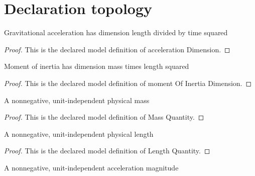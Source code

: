 \section{Declaration topology}
\begin{definition}
  \label{def:physics:phyx-mini-0782:phyxminiproblems-problemphyxmini0782-accelerationdimension}
  Gravitational acceleration has dimension length divided by time squared
\end{definition}
\begin{proof}
  This is the declared model definition of acceleration Dimension.
\end{proof}
\begin{definition}
  \label{def:physics:phyx-mini-0782:phyxminiproblems-problemphyxmini0782-momentofinertiadimension}
  Moment of inertia has dimension mass times length squared
\end{definition}
\begin{proof}
  This is the declared model definition of moment Of Inertia Dimension.
\end{proof}
\begin{definition}
  \label{def:physics:phyx-mini-0782:phyxminiproblems-problemphyxmini0782-massquantity}
  A nonnegative, unit-independent physical mass
\end{definition}
\begin{proof}
  This is the declared model definition of Mass Quantity.
\end{proof}
\begin{definition}
  \label{def:physics:phyx-mini-0782:phyxminiproblems-problemphyxmini0782-lengthquantity}
  A nonnegative, unit-independent physical length
\end{definition}
\begin{proof}
  This is the declared model definition of Length Quantity.
\end{proof}
\begin{definition}
  \label{def:physics:phyx-mini-0782:phyxminiproblems-problemphyxmini0782-accelerationquantity}
  A nonnegative, unit-independent acceleration magnitude
\end{definition}
